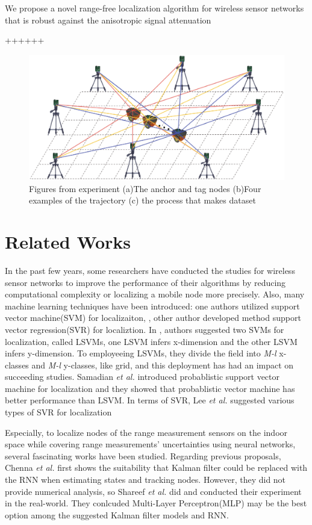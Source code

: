 \documentclass{ieeeaccess}
\begin{document}
We propose a novel range-free localization algorithm
for wireless sensor networks that is robust against the anisotropic
signal attenuation

++++++

\begin{figure}[h]
	\centering
	\includegraphics[width=.5\textwidth]{image/Access_overview_figure_1}
	\caption{Figures from experiment (a)The anchor and tag nodes (b)Four examples of the trajectory (c) the process that makes dataset}
	\label{fig:experiment}
\end{figure}

\section{Related Works}


In the past few years, some researchers have conducted the studies for wireless sensor networks to improve the performance of their algorithms by reducing computational complexity or localizing a mobile node more precisely. Also, many machine learning techniques have been introduced: one authors utilized support vector machine(SVM) for localizaiton, \cite{tran2008localization, huan2010three, feng2012determination, afzal2014localization}, other author developed method support vector regression(SVR) for localiztion\cite{lee2013new, lee2013novel}. In \cite{tran2008localization}, authors suggested two SVMs for localization, called LSVMs, one LSVM infers x-dimension and the other LSVM infers y-dimension. To employeeing LSVMs, they divide the field into \textit{M-l} x-classes and \textit{M-l} y-classes, like grid, and this deployment has had an impact on succeeding studies\cite{chatterjee2010fletcher, feng2012determination, afzal2014localization}. Samadian \textit{et al.}\cite{samadian2011probabilistic} introduced probablistic support vector machine for localization and they showed that probablistic vector machine has better performance than LSVM. In terms of SVR, Lee \textit{et al.} suggested various types of SVR for localization\cite{lee2013new, lee2013novel}  

Especially, to localize nodes of the range measurement sensors on the indoor space while covering range measurements' uncertainties using neural networks, several fascinating works have been studied. Regarding previous proposals, Chenna \textit{et al.} first shows the suitability that Kalman filter could be replaced with the RNN when estimating states and tracking nodes\cite{chenna2004state}. However, they did not provide numerical analysis, so Shareef \textit{et al.} did\cite{shareef2008localization} and conducted their experiment in the real-world. They conlcuded Multi-Layer Perceptron(MLP) may be the best option among the suggested Kalman filter models and RNN. 
\end{document}
